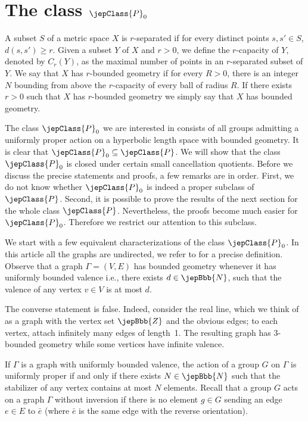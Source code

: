 \section{The class \texorpdfstring{$\jepClass{P}_0$}{P0}}
\begin{definition}\label{def:geometry}
A subset $S$ of a metric space $X$ is $r$-separated if for every distinct points $s,s'\in S$, $d(s,s')\geqslant r$. Given a subset $Y$ of $X$ and $r>0$, we define the $r$-capacity of $Y$, denoted by $C_r(Y)$, as the maximal number of points in an $r$-separated subset of $Y$. We say that $X$ has $r$-bounded geometry if for every $R>0$, there is an integer $N$ bounding from above the $r$-capacity of every ball of radius $R$. If there exists $r>0$ such that $X$ has $r$-bounded geometry we simply say that $X$ has bounded geometry.
\end{definition}
The class $\jepClass{P}_0$ we are interested in consists of all groups admitting a uniformly proper action on a hyperbolic length space with bounded geometry. It is clear that $\jepClass{P}_0\subseteq\jepClass{P}$. We will show that the class $\jepClass{P}_0$ is closed under certain small cancellation quotients. Before we discuss the precise statements and proofs, a few remarks are in
order. First, we do not know whether $\jepClass{P}_0$ is indeed a proper subclass of $\jepClass{P}$. Second, it is possible to prove the results of the next section for the whole class $\jepClass{P}$. Nevertheless, the proofs become much easier for $\jepClass{P}_0$. Therefore we restrict our attention to this subclass.

We start with a few equivalent characterizations of the class $\jepClass{P}_0$. In this article all the graphs are undirected, we refer to \cite{ref17} for a precise definition. Observe that a graph $\Gamma=(V,E)$ has bounded geometry whenever it has uniformly bounded valence i.e., there exists $d\in\jepBbb{N}$, such that the valence of any vertex $v\in V$ is at most $d$.

\begin{remark}
The converse statement is false. Indeed, consider the real line, which we think of as a graph with the vertex set $\jepBbb{Z}$ and the obvious edges; to each vertex, attach infinitely many edges of length~1. The resulting graph has 3-bounded geometry while some vertices have infinite valence.
\end{remark}
If $\Gamma$ is a graph with uniformly bounded valence, the action of a group $G$ on $\Gamma$ is uniformly proper if and only if there exists $N\in\jepBbb{N}$ such that the stabilizer of any vertex contains at most $N$ elements. Recall that a group $G$ acts on a graph $\Gamma$ without inversion if there is no element $g\in G$ sending an edge $e\in E$ to $\bar e$ (where $\bar e$ is the same edge with the reverse orientation).

